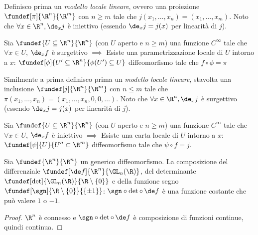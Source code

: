 Definisco prima un \emph{modello locale lineare}, ovvero una proiezione $\fundef[\pi]{\R^n}{\R^m}$ con $n \ge m$ tale che $j(x_1,\dots,x_n)=(x_1,\dots,x_m)$. Noto che $\forall x \in \R^n, \de_xj$ è iniettivo (essendo $\de_xj=j(x)$ per linearità di $j$).

\begin{teo}
\label{th:funimpsurg}
Sia $\fundef{U \subseteq \R^n}{\R^n}$ (con $U$ aperto e $n \ge m$) una funzione $C^\infty$ tale che $\forall x \in U$, $\de_xf$ è surgettivo $\implies$ Esiste una parametrizzazione locale di $U$ intorno a $x$: $\fundef[\phi]{U'\subseteq \R^n}{\phi(U')\subseteq U}$ diffeomorfismo tale che $f \circ \phi = \pi$
\end{teo}

\begin{center}
\hspace{1cm}

\end{center}

Similmente a prima definisco prima un \emph{modello locale lineare}, stavolta una inclusione $\fundef[j]{\R^n}{\R^m}$ con $n \le m$ tale che $\pi(x_1,\dots,x_n)=(x_1,\dots,x_n,0,0,\dots)$. Noto che $\forall x \in \R^n, \de_xj$ è surgettivo (essendo $\de_xj=j(x)$ per linearità di $j$).

\begin{teo}

Sia $\fundef{U \subseteq \R^n}{\R^n}$ (con $U$ aperto e $n \ge m$) una funzione $C^\infty$ tale che $\forall x \in U$, $\de_xf$ è iniettivo $\implies$ Esiste una carta locale di $U$ intorno a $x$: $\fundef[\psi]{U}{U''\subset \R^m}$ diffeomorfismo tale che $\psi \circ f = j$.
\end{teo}

\begin{center}

\end{center}

\begin{prop}
Sia $\fundef{\R^n}{\R^n}$ un generico diffeomorfismo. La composizione del differenziale $\fundef[\de f]{\R^n}{\GL_n(\R)}$, del determinante $\fundef[\det]{\GL_n(\R)}{\R\setminus\{0\}}$ e della funzione segno $\fundef[\sgn]{\R\setminus\{0\}}{\{\pm1\}}$: $\sgn \circ \det \circ \,\de f$ è una funzione costante che può valere $1$ o $-1$.
\end{prop}

\begin{proof}
$\R^n$ è connesso e $\sgn \circ \det \circ \,\de f$ è composizione di funzioni continue, quindi continua.
\end{proof}

